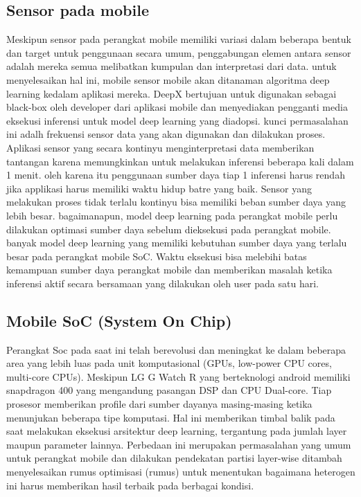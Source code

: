 \subsection{Sensor pada mobile}
Meskipun sensor pada perangkat mobile memiliki variasi dalam beberapa bentuk dan target untuk penggunaan secara umum, penggabungan elemen antara sensor adalah mereka semua melibatkan kumpulan dan interpretasi dari data. untuk menyelesaikan hal ini, mobile sensor mobile akan ditanaman algoritma deep learning kedalam aplikasi mereka. DeepX bertujuan untuk digunakan sebagai black-box oleh developer dari aplikasi mobile dan menyediakan pengganti media eksekusi inferensi untuk model deep learning yang diadopsi. kunci permasalahan ini adalh frekuensi sensor data yang akan digunakan dan dilakukan proses. Aplikasi sensor yang secara kontinyu menginterpretasi data memberikan tantangan karena memungkinkan untuk melakukan inferensi beberapa kali dalam 1 menit. oleh karena itu penggunaan sumber daya tiap 1 inferensi harus rendah jika applikasi harus memiliki waktu hidup batre yang baik. Sensor yang melakukan proses tidak terlalu kontinyu bisa memiliki beban sumber daya yang lebih besar. bagaimanapun, model deep learning pada perangkat mobile perlu dilakukan optimasi sumber daya sebelum dieksekusi pada perangkat mobile. banyak model deep learning yang memiliki kebutuhan sumber daya yang terlalu besar pada perangkat mobile SoC. Waktu eksekusi bisa melebihi batas kemampuan sumber daya perangkat mobile dan memberikan masalah ketika inferensi aktif secara bersamaan yang dilakukan oleh user pada satu hari.

\subsection{Mobile SoC (System On Chip)}
Perangkat Soc pada saat ini telah berevolusi dan meningkat ke dalam beberapa area yang lebih luas pada unit komputasional (GPUs, low-power CPU cores, multi-core CPUs). Meskipun LG G Watch R yang berteknologi android memiliki snapdragon 400 yang mengandung pasangan DSP dan CPU Dual-core. Tiap prosesor memberikan profile dari sumber dayanya masing-masing ketika menunjukan beberapa tipe komputasi. Hal ini memberikan timbal balik pada saat melakukan eksekusi arsitektur deep learning, tergantung pada jumlah layer maupun parameter lainnya. Perbedaan ini merupakan permasalahan yang umum untuk perangkat mobile dan dilakukan pendekatan partisi layer-wise ditambah menyelesaikan rumus optimisasi (rumus) untuk menentukan bagaimana heterogen ini harus memberikan hasil terbaik pada berbagai kondisi.

